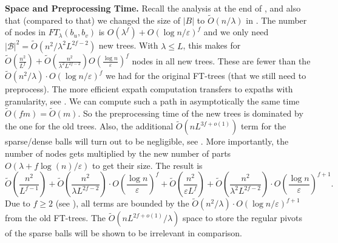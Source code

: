 \documentclass{article}\usepackage[a4paper,margin=20mm]{geometry}
\newcommand*{\B}{\mathcal{B}}
\newcommand*{\Otilde}{\widetilde{O}}
\renewcommand{\le}{\leqslant}
\renewcommand{\ge}{\geqslant}
\newcommand{\eps}{\varepsilon}
\begin{document}
\noindent
\textbf{Space and Preprocessing Time.}
Recall the analysis at the end of ,
and also that (compared to that) we changed the size of $|B|$ to $\Otilde(n/\lambda)$
in .
The number of nodes in $FT_{\lambda}(b_u,b_v)$ is $O(\lambda^f) + O(\log n/\varepsilon)^f$
and we only need $|\B|^2 = \Otilde(n^2/\lambda^2 L^{2f-2})$ new trees.
With $\lambda \le L$, this makes for
	$\Otilde\!\left(\frac{n^2}{L^{f}} \right) + 
		\Otilde\!\left(\frac{n^2}{\lambda^2 L^{2f-2}}\right)  
			O\!\left(\frac{\log n}{\varepsilon} \right)^f$
nodes in all new trees.
These are fewer than the $\Otilde(n^2/\lambda) \cdot O(\log n/\varepsilon)^f$
we had for the original FT-trees (that we still need to preprocess).
The more efficient expath computation transfers to expaths with granularity,
see .
We can compute such a path in asymptotically the same time $\Otilde(fm) = \Otilde(m)$.
So the preprocessing time of the new trees is dominated by the one for the old trees.
Also, the additional $\Otilde(nL^{3f+o(1)})$ term for the sparse/dense balls
will turn out to be negligible, see .
%
More importantly, the number of nodes
gets multiplied by the new number of parts $O(\lambda+ f \log(n)/\eps)$ to get their size.
The result is
\begin{equation*}
	\Otilde\!\left(\frac{n^2}{L^{f-1}}\right)
		+ \Otilde\!\left(\frac{n^2}{\lambda L^{2f-2}}\right) 
			\cdot O\!\left(\frac{\log n}{\varepsilon} \right)^f +
		\Otilde\!\left(\frac{n^2}{\varepsilon L^{f}}\right)
		+ \Otilde\!\left(\frac{n^2}{\lambda^2 L^{2f-2}}\right) 
			\cdot O\!\left(\frac{\log n}{\varepsilon} \right)^{f+1}\!.
\end{equation*}
Due to $f \ge 2$ (see ),
all terms are bounded by the $\Otilde(n^2/\lambda) \cdot O(\log n/\varepsilon)^{f+1}$
from the old FT-trees.
The $\Otilde(nL^{2f+o(1)}/\lambda)$ space to store the regular pivots
of the sparse balls will be shown to be irrelevant in comparison.
\vspace*{.5em}
\end{document}
